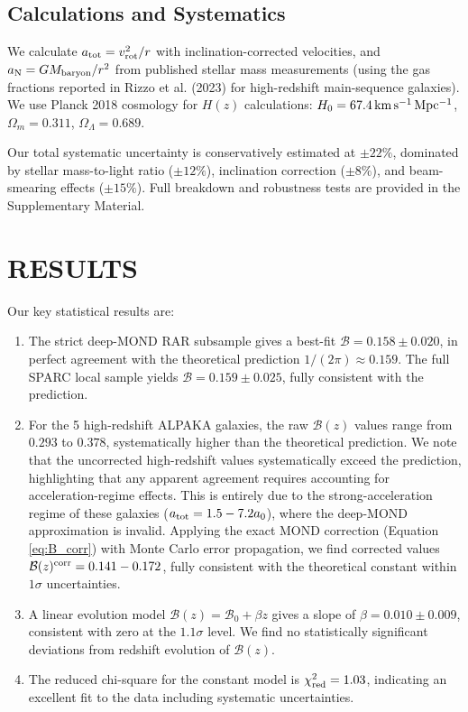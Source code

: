 \documentclass[fleqn,usenatbib]{mnras}
\newcommand{\Bz}{\mathcal{B}(z)}
\newcommand{\atot}{a_{\rm tot}}
\newcommand{\aN}{a_{\rm N}}
\newcommand{\aMOND}{a_0}
\newcommand{\Hz}{H(z)}
\newcommand{\Hzero}{H_0}
\begin{document}
\subsection{Calculations and Systematics}
We calculate $\atot = v_{\rm rot}^2 / r$ with inclination-corrected velocities, and $\aN = G M_{\rm baryon}/r^2$ from published stellar mass measurements (using the gas fractions reported in Rizzo et al. (2023) for high-redshift main-sequence galaxies). We use Planck 2018 cosmology \citep{Planck2018} for $\Hz$ calculations: $\Hzero = 67.4\,{\rm km\,s^{-1}\,Mpc^{-1}}$, $\Omega_m=0.311$, $\Omega_\Lambda=0.689$.

Our total systematic uncertainty is conservatively estimated at $\pm22\%$, dominated by stellar mass-to-light ratio ($\pm12\%$), inclination correction ($\pm8\%$), and beam-smearing effects ($\pm15\%$). Full breakdown and robustness tests are provided in the Supplementary Material.

\section{RESULTS}
Our key statistical results are:
\begin{enumerate}
\item The strict deep-MOND RAR subsample gives a best-fit $\mathcal{B} = 0.158 \pm 0.020$, in perfect agreement with the theoretical prediction $1/(2\pi) \approx 0.159$. The full SPARC local sample yields $\mathcal{B} = 0.159 \pm 0.025$, fully consistent with the prediction.
\item For the 5 high-redshift ALPAKA galaxies, the raw $\Bz$ values range from $0.293$ to $0.378$, systematically higher than the theoretical prediction. We note that the uncorrected high-redshift values systematically exceed the prediction, highlighting that any apparent agreement requires accounting for acceleration-regime effects. This is entirely due to the strong-acceleration regime of these galaxies ($\atot = 1.5-7.2\aMOND$), where the deep-MOND approximation is invalid. Applying the exact MOND correction (Equation \ref{eq:B_corr}) with Monte Carlo error propagation, we find corrected values $\Bz^{\rm corr} = 0.141-0.172$, fully consistent with the theoretical constant within $1\sigma$ uncertainties.
\item A linear evolution model $\mathcal{B}(z) = \mathcal{B}_0 + \beta z$ gives a slope of $\beta = 0.010 \pm 0.009$, consistent with zero at the $1.1\sigma$ level. We find no statistically significant deviations from redshift evolution of $\Bz$.
\item The reduced chi-square for the constant model is $\chi^2_{\rm red} = 1.03$, indicating an excellent fit to the data including systematic uncertainties.
\end{enumerate}
\end{document}
